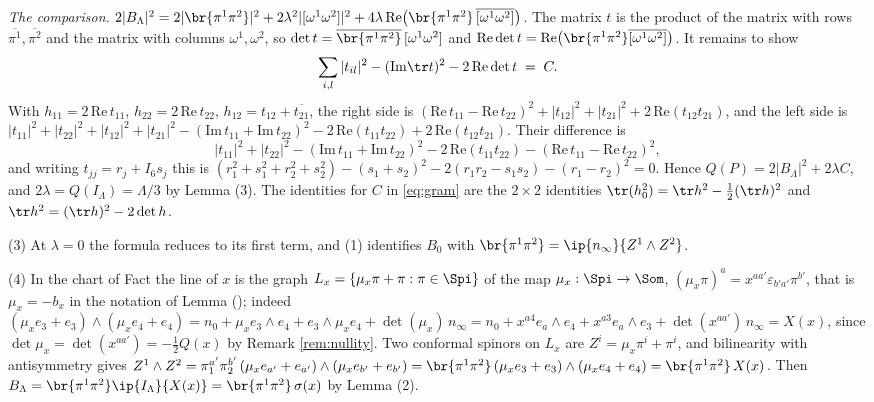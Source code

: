 \emph{The comparison.} $2|B_{\Lambda}|^{2} = 2|\br{\pi^{1}\pi^{2}}|^{2} + 2\lambda^{2}|[\omega^{1}\omega^{2}]|^{2} + 4\lambda\,\mathrm{Re}\bigl(\br{\pi^{1}\pi^{2}}\,\overline{[\omega^{1}\omega^{2}]}\bigr)$. The matrix $t$ is the product of the matrix with rows $\overline{\pi^{1}}, \overline{\pi^{2}}$ and the matrix with columns $\omega^{1}, \omega^{2}$, so $\det t = \overline{\br{\pi^{1}\pi^{2}}}\,[\omega^{1}\omega^{2}]$ and $\mathrm{Re}\det t = \mathrm{Re}\bigl(\br{\pi^{1}\pi^{2}}\overline{[\omega^{1}\omega^{2}]}\bigr)$. It remains to show
\[
\sum_{i,l}|t_{il}|^{2} - (\mathrm{Im}\tr t)^{2} - 2\,\mathrm{Re}\det t \;=\; C .
\]
With $h_{11} = 2\,\mathrm{Re}\,t_{11}$, $h_{22} = 2\,\mathrm{Re}\,t_{22}$, $h_{12} = t_{12} + \overline{t_{21}}$, the right side is $(\mathrm{Re}\,t_{11} - \mathrm{Re}\,t_{22})^{2} + |t_{12}|^{2} + |t_{21}|^{2} + 2\,\mathrm{Re}(t_{12}t_{21})$, and the left side is $|t_{11}|^{2} + |t_{22}|^{2} + |t_{12}|^{2} + |t_{21}|^{2} - (\mathrm{Im}\,t_{11} + \mathrm{Im}\,t_{22})^{2} - 2\,\mathrm{Re}(t_{11}t_{22}) + 2\,\mathrm{Re}(t_{12}t_{21})$. Their difference is
\[
|t_{11}|^{2} + |t_{22}|^{2} - (\mathrm{Im}\,t_{11} + \mathrm{Im}\,t_{22})^{2} - 2\,\mathrm{Re}(t_{11}t_{22}) - (\mathrm{Re}\,t_{11} - \mathrm{Re}\,t_{22})^{2},
\]
and writing $t_{jj} = r_{j} + I_{6} s_{j}$ this is $(r_{1}^{2} + s_{1}^{2} + r_{2}^{2} + s_{2}^{2}) - (s_{1} + s_{2})^{2} - 2(r_{1}r_{2} - s_{1}s_{2}) - (r_{1} - r_{2})^{2} = 0$. Hence $Q(P) = 2|B_{\Lambda}|^{2} + 2\lambda C$, and $2\lambda = Q(I_{\Lambda}) = \Lambda/3$ by Lemma (3). The identities for $C$ in \eqref{eq:gram} are the $2\times 2$ identities $\tr(h_{0}^{2}) = \tr h^{2} - \tfrac12(\tr h)^{2}$ and $\tr h^{2} = (\tr h)^{2} - 2\det h$.

(3) At $\lambda = 0$ the formula reduces to its first term, and (1) identifies $B_{0}$ with $\br{\pi^{1}\pi^{2}} = \ip{n_{\infty}}{Z^{1}\wedge Z^{2}}$.

(4) In the chart of Fact  the line of $x$ is the graph $L_{x} = \{\mu_{x}\pi + \pi : \pi \in \Spi\}$ of the map $\mu_{x}: \Spi \to \Som$, $(\mu_{x}\pi)^{a} = x^{aa'}\varepsilon_{b'a'}\pi^{b'}$, that is $\mu_{x} = -b_{x}$ in the notation of Lemma  \cite[Thm.~4.2]{ButlerT9} (); indeed $(\mu_{x}e_{3} + e_{3})\wedge(\mu_{x}e_{4} + e_{4}) = n_{0} + \mu_{x}e_{3}\wedge e_{4} + e_{3}\wedge\mu_{x}e_{4} + \det(\mu_{x})\,n_{\infty} = n_{0} + x^{a4}e_{a}\wedge e_{4} + x^{a3}e_{a}\wedge e_{3} + \det(x^{aa'})\,n_{\infty} = X(x)$, since $\det\mu_{x} = \det(x^{aa'}) = -\tfrac12 Q(x)$ by Remark \ref{rem:nullity}. Two conformal spinors on $L_{x}$ are $Z^{i} = \mu_{x}\pi^{i} + \pi^{i}$, and bilinearity with antisymmetry gives $Z^{1}\wedge Z^{2} = \pi_{1}^{a'}\pi_{2}^{b'}\,(\mu_{x}e_{a'} + e_{a'})\wedge(\mu_{x}e_{b'} + e_{b'}) = \br{\pi^{1}\pi^{2}}\,(\mu_{x}e_{3} + e_{3})\wedge(\mu_{x}e_{4} + e_{4}) = \br{\pi^{1}\pi^{2}}\,X(x)$. Then $B_{\Lambda} = \br{\pi^{1}\pi^{2}}\ip{I_{\Lambda}}{X(x)} = \br{\pi^{1}\pi^{2}}\,\sigma(x)$ by Lemma (2).

